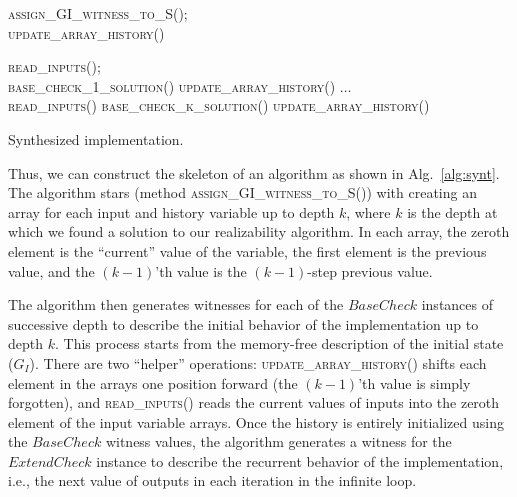 \begin{algorithm2e}[tb!]
\SetAlgoSkip{}

\BlankLine
  \textsc{assign\_GI\_witness\_to\_S()}; 	\\
  \textsc{update\_array\_history()}\;

\BlankLine
  \textsc{read\_inputs()}; 		\\
  \textsc{base\_check\_1\_solution()}\;
  \textsc{update\_array\_history()}\;
  $\ldots$\\
  \textsc{read\_inputs()}\;
  \textsc{base\_check\_k\_solution()}\;
  \textsc{update\_array\_history()}\;
  
\BlankLine  


\caption{Synthesized implementation.}
\label{alg:synt}
\end{algorithm2e}


Thus, we can construct the skeleton of an algorithm as shown in Alg.~\ref{alg:synt}.  
The algorithm stars (method \textsc{assign\_GI\_witness\_to\_S()}) with creating an array for each input and history variable up to depth
$k$, where $k$ is the depth at which we found a solution to our realizability algorithm.
In each array, the zeroth element is the ``current'' value of the variable, the first element is the previous value, and the $(k-1)$'th value is the $(k-1)$-step previous value.

The algorithm then generates witnesses for each of the $\mathit{BaseCheck}$ instances of
successive depth to describe the initial behavior of
the implementation up to depth $k$.  This process starts from the memory-free
description of the initial state ($G_I$). 
There are two ``helper'' operations:
\textsc{update\_array\_history()} shifts each element in the arrays one position forward
(the $(k-1)$'th value is simply forgotten), and \textsc{read\_inputs()} reads the current values of inputs into the zeroth element of the input variable arrays.  Once the history is entirely initialized using the $\mathit{BaseCheck}$ witness values, 
the algorithm generates a witness for the $\mathit{ExtendCheck}$ instance to describe the recurrent behavior of
the implementation, i.e., the next value of outputs in each iteration in the infinite loop.

